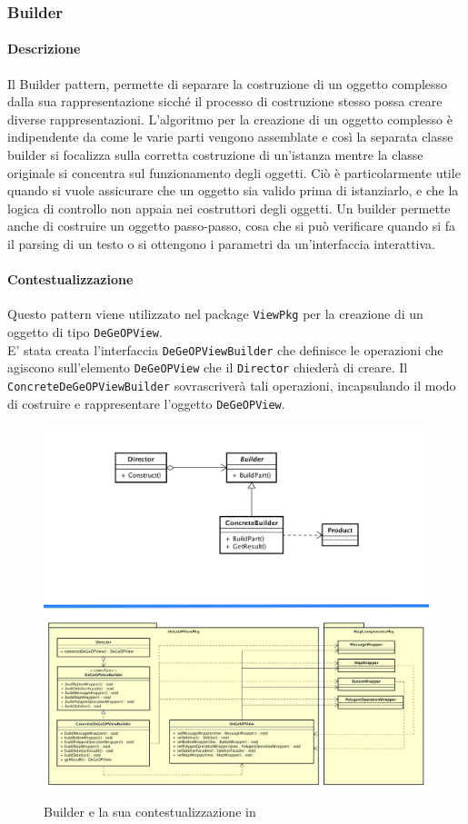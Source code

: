 \newpage
\subsubsection{Builder}
\paragraph{Descrizione}
Il Builder pattern, permette di separare la costruzione di un oggetto complesso dalla sua rappresentazione sicché il processo di costruzione stesso possa creare diverse rappresentazioni.
L'algoritmo per la creazione di un oggetto complesso è indipendente da come le varie parti vengono assemblate e così la separata classe builder si focalizza sulla corretta costruzione di un'istanza mentre la classe originale si concentra sul funzionamento degli oggetti. Ciò è particolarmente utile quando si vuole assicurare che un oggetto sia valido prima di istanziarlo, e che la logica di controllo non appaia nei costruttori degli oggetti. Un builder permette anche di costruire un oggetto passo-passo, cosa che si può verificare quando si fa il parsing di un testo o si ottengono i parametri da un'interfaccia interattiva.
\paragraph{Contestualizzazione}
Questo pattern viene utilizzato nel package  \texttt{ViewPkg} per la creazione di un oggetto di tipo  \texttt{DeGeOPView}.
\\E' stata creata l'interfaccia \texttt{DeGeOPViewBuilder} che definisce le operazioni che agiscono sull'elemento \texttt{DeGeOPView} che il \texttt{Director} chiederà di creare. Il  \texttt{ConcreteDeGeOPViewBuilder} sovrascriverà tali operazioni, incapsulando il modo di costruire e rappresentare l'oggetto \texttt{DeGeOPView}.
	\begin{figure}[H]
		\label{builder_compara}
		\centering
		\includegraphics[scale=0.13]{img/builderComparati.png}
		\caption{Builder e la sua contestualizzazione in \progetto}
	\end{figure}

